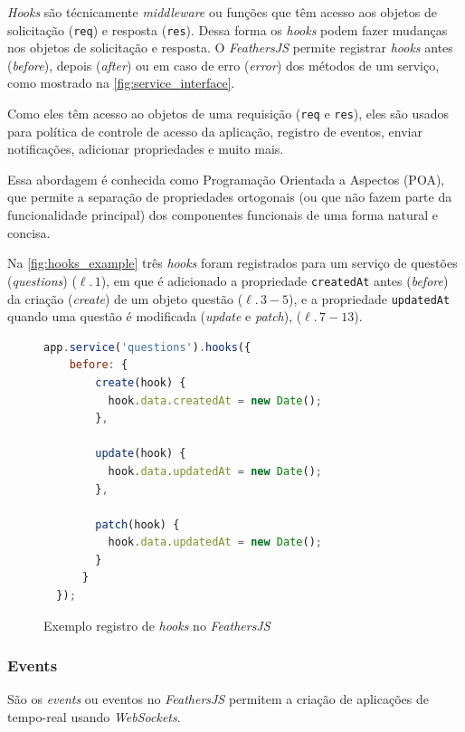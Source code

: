 \textit{Hooks} são técnicamente \textit{middleware} ou funções que têm acesso aos
objetos de solicitação (\texttt{req}) e resposta (\texttt{res}).
Dessa forma os \textit{hooks} podem fazer mudanças nos objetos de solicitação e resposta.
O \textit{\textit{FeathersJS}} permite registrar \textit{hooks} antes (\textit{before}), depois
(\textit{after}) ou em caso de erro (\textit{error}) dos métodos de
um serviço, como mostrado na \autoref{fig:service_interface}.

Como eles têm acesso ao objetos de uma requisição (\texttt{req} e \texttt{res}), eles são usados
para política de controle de acesso da aplicação, registro de eventos, enviar
notificações, adicionar propriedades e muito mais.

Essa abordagem é conhecida como Programação Orientada a Aspectos (POA), que permite
a separação de propriedades ortogonais (ou que não fazem parte da funcionalidade
principal) dos componentes funcionais de uma forma natural e concisa.

Na \autoref{fig:hooks_example} três \textit{hooks} foram registrados para um serviço de questões (\textit{questions}) ($\ell.\,1$),
em que é adicionado a propriedade \texttt{createdAt} antes (\textit{before}) da criação (\textit{create}) de um objeto questão ($\ell.\,3-5$),
e a propriedade \texttt{updatedAt} quando uma questão é modificada (\textit{update} e \textit{patch}), ($\ell.\,7-13$).

\begin{figure}[h]
\caption{Exemplo registro de \textit{hooks} no \textit{\textit{FeathersJS}}}
\label{fig:hooks_example}
\begin{lstlisting}[language=JavaScript]
  app.service('questions').hooks({
    before: {
        create(hook) {
          hook.data.createdAt = new Date();
        },

        update(hook) {
          hook.data.updatedAt = new Date();
        },

        patch(hook) {
          hook.data.updatedAt = new Date();
        }
      }
  });
\end{lstlisting}
\doautor
\end{figure}

\subsubsection{Events}

São os \textit{events} ou eventos no \textit{\textit{FeathersJS}} permitem
a criação de aplicações de tempo-real usando \textit{WebSockets}.

